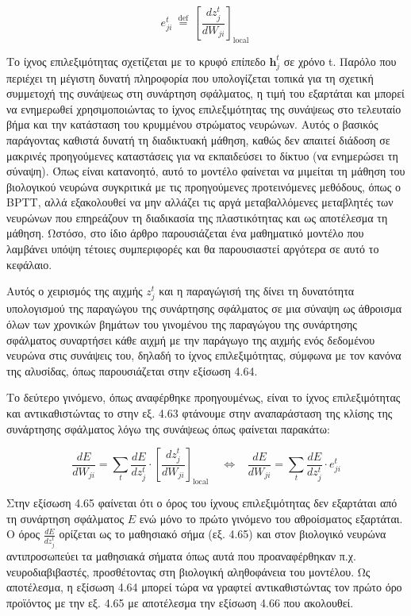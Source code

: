 \documentclass[12pt]{report}
\begin{document}
\begin{equation}
    e_{j i}^{t} \stackrel{\text { def }}{=}\left[\frac{d z_{j}^{t}}{d W_{j i}}\right]_{\text {local }}
\end{equation}

Το ίχνος επιλεξιμότητας σχετίζεται με το κρυφό επίπεδο $\mathbf{h}_{j}^{t}$ σε χρόνο \textlatin{t}. Παρόλο που περιέχει τη μέγιστη δυνατή πληροφορία που υπολογίζεται τοπικά για τη σχετική συμμετοχή της συνάψεως στη συνάρτηση σφάλματος, η τιμή του εξαρτάται και μπορεί να ενημερωθεί χρησιμοποιώντας το ίχνος επιλεξιμότητας της συνάψεως στο τελευταίο βήμα και την κατάσταση του κρυμμένου στρώματος νευρώνων. Αυτός ο βασικός παράγοντας καθιστά δυνατή τη διαδικτυακή μάθηση, καθώς δεν απαιτεί διάδοση σε μακρινές προηγούμενες καταστάσεις για να εκπαιδεύσει το δίκτυο (να ενημερώσει τη σύναψη). Όπως είναι κατανοητό, αυτό το μοντέλο φαίνεται να μιμείται τη μάθηση του βιολογικού νευρώνα συγκριτικά με τις προηγούμενες προτεινόμενες μεθόδους, όπως ο \textlatin{BPTT}, αλλά εξακολουθεί να μην αλλάζει τις αργά μεταβαλλόμενες μεταβλητές των νευρώνων που επηρεάζουν τη διαδικασία της πλαστικότητας και ως αποτέλεσμα τη μάθηση. Ωστόσο, στο ίδιο άρθρο \cite{Bellec2020} παρουσιάζεται ένα μαθηματικό μοντέλο που λαμβάνει υπόψη τέτοιες συμπεριφορές και θα παρουσιαστεί αργότερα σε αυτό το κεφάλαιο.

Αυτός ο χειρισμός της αιχμής \(z^t_j\) και η παραγώγισή της δίνει τη δυνατότητα υπολογισμού της παραγώγου της συνάρτησης σφάλματος σε μια σύναψη ως άθροισμα όλων των χρονικών βημάτων του γινομένου της παραγώγου της συνάρτησης σφάλματος συναρτήσει κάθε αιχμή με την παράγωγο της αιχμής ενός δεδομένου νευρώνα στις συνάψεις του, δηλαδή το ίχνος επιλεξιμότητας, σύμφωνα με τον κανόνα της αλυσίδας, όπως παρουσιάζεται στην εξίσωση 4.64.

Το δεύτερο γινόμενο, όπως αναφέρθηκε προηγουμένως, είναι το ίχνος επιλεξιμότητας και αντικαθιστώντας το στην εξ. 4.63 φτάνουμε στην αναπαράσταση της κλίσης της συνάρτησης σφάλματος λόγω της συνάψεως όπως φαίνεται παρακάτω:

\begin{equation}
    \frac{d E}{d W_{j i}}=\sum_{t} \frac{d E}{d z_{j}^{t}} \cdot\left[\frac{d z_{j}^{t}}{d W_{j i}}\right]_{\text {local }}
    \;\;\; \Longleftrightarrow \;\;\;
    \frac{d E}{d W_{j i}}=\sum_{t} \frac{d E}{d z_{j}^{t}} \cdot e_{ji}^t
\end{equation}

Στην εξίσωση 4.65 φαίνεται ότι ο όρος του ίχνους επιλεξιμότητας δεν εξαρτάται από τη συνάρτηση σφάλματος \(E\) ενώ μόνο το πρώτο γινόμενο του αθροίσματος εξαρτάται. Ο όρος \(\frac{dE}{dz_j^t}\) ορίζεται ως το μαθησιακό σήμα (εξ. 4.65) και στον βιολογικό νευρώνα αντιπροσωπεύει τα μαθησιακά σήματα όπως αυτά που προαναφέρθηκαν π.χ. νευροδιαβιβαστές, προσθέτοντας στη βιολογική αληθοφάνεια του μοντέλου. Ως αποτέλεσμα, η εξίσωση 4.64 μπορεί τώρα να γραφτεί αντικαθιστώντας τον πρώτο όρο προϊόντος με την εξ. 4.65 με αποτέλεσμα την εξίσωση 4.66 που ακολουθεί.
\end{document}
